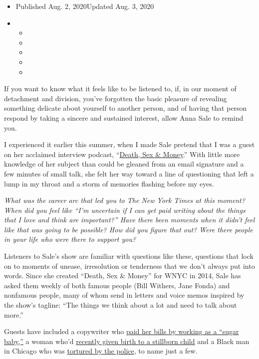 \begin{itemize}
\item
  Published Aug. 2, 2020Updated Aug. 3, 2020
\item
  \begin{itemize}
  \item
  \item
  \item
  \item
  \item
  \end{itemize}
\end{itemize}

If you want to know what it feels like to be listened to, if, in our
moment of detachment and division, you've forgotten the basic pleasure
of revealing something delicate about yourself to another person, and of
having that person respond by taking a sincere and sustained interest,
allow Anna Sale to remind you.

I experienced it earlier this summer, when I made Sale pretend that I
was a guest on her acclaimed interview podcast,
``\href{https://www.wnycstudios.org/podcasts/deathsexmoney}{Death, Sex
\& Money}.'' With little more knowledge of her subject than could be
gleaned from an email signature and a few minutes of small talk, she
felt her way toward a line of questioning that left a lump in my throat
and a storm of memories flashing before my eyes.

\emph{What was the career arc that led you to The New York Times at this
moment? When did you feel like ``I'm uncertain if I can get paid writing
about the things that I love and think are important?'' Have there been
moments when it didn't feel like that was going to be possible? How did
you figure that out? Were there people in your life who were there to
support you?}

Listeners to Sale's show are familiar with questions like these,
questions that lock on to moments of unease, irresolution or tenderness
that we don't always put into words. Since she created ``Death, Sex \&
Money'' for WNYC in 2014, Sale has asked them weekly of both famous
people (Bill Withers, Jane Fonda) and nonfamous people, many of whom
send in letters and voice memos inspired by the show's tagline: ``The
things we think about a lot and need to talk about more.''

Guests have included a copywriter who
\href{https://www.wnycstudios.org/podcasts/deathsexmoney/episodes/seeking-arrangement-sugar-daddy-death-sex-money}{paid
her bills by working as a ``sugar baby,''} a woman who'd
\href{https://www.wnycstudios.org/podcasts/deathsexmoney/episodes/stillbirth-death-sex-money}{recently
given birth to a stillborn child} and a Black man in Chicago who was
\href{https://www.wnycstudios.org/podcasts/deathsexmoney/episodes/darrell-cannon-2020-death-sex-money}{tortured
by the police}, to name just a few.

